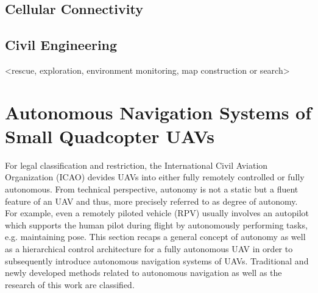 

\subsection{Cellular Connectivity}



\subsection{Civil Engineering}



<rescue,   exploration,  environment  monitoring,  map  construction  or  search>




\section{Autonomous Navigation Systems of Small Quadcopter UAVs}

For legal classification and restriction,
the International Civil Aviation Organization (ICAO)
devides UAVs into either fully remotely controlled 
or fully autonomous.
From technical perspective,
autonomy is not a static
but a fluent feature of an UAV
and thus, more precisely referred to as
degree of autonomy. For example,
even a remotely piloted vehicle (RPV)
usually involves an autopilot
which supports the human pilot
during flight by autonomously
performing tasks, e.g. maintaining pose.
This section recaps a general
concept of autonomy as well as
a hierarchical control architecture for a
fully autonomous UAV in order to
subsequently introduce
autonomous navigation systems of UAVs.
Traditional and newly developed methods
related to autonomous navigation
as well as 
the research of this work are classified.





